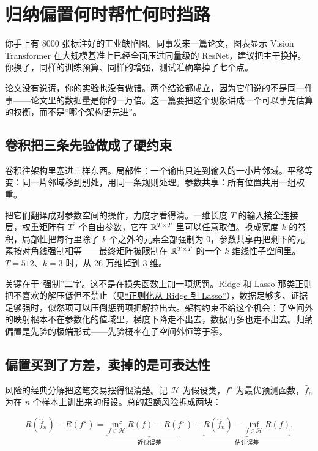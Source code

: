 \section{归纳偏置何时帮忙何时挡路}
\label{sec:14-Deep-Learning/04-Convolutional-Networks/05}

你手上有 8000 张标注好的工业缺陷图。同事发来一篇论文，图表显示 Vision Transformer 在大规模基准上已经全面压过同量级的 ResNet，建议把主干换掉。你换了，同样的训练预算、同样的增强，测试准确率掉了七个点。

论文没有说谎，你的实验也没有做错。两个结论都成立，因为它们说的不是同一件事——论文里的数据量是你的一万倍。这一篇要把这个现象讲成一个可以事先估算的权衡，而不是``哪个架构更先进''。

\subsection{卷积把三条先验做成了硬约束}

卷积往架构里塞进三样东西。局部性：一个输出只连到输入的一小片邻域。平移等变：同一片邻域移到别处，用同一条规则处理。参数共享：所有位置共用一组权重。

把它们翻译成对参数空间的操作，力度才看得清。一维长度 \(T\) 的输入接全连接层，权重矩阵有 \(T^2\) 个自由参数，它在 \(\mathbb{R}^{T\times T}\) 里可以任意取值。换成宽度 \(k\) 的卷积，局部性把每行里除了 \(k\) 个之外的元素全部强制为 0，参数共享再把剩下的元素按对角线强制相等——最终矩阵被限制在 \(\mathbb{R}^{T\times T}\) 的一个 \(k\) 维线性子空间里。\(T=512\)、\(k=3\) 时，从 26 万维掉到 3 维。

关键在于``强制''二字。这不是在损失函数上加一项惩罚。Ridge 和 Lasso 那类正则把不喜欢的解压低但不禁止（见\hyperref[sec:13-Machine-Learning/02-Linear-Models/02]{``正则化从 Ridge 到 Lasso''}），数据足够多、证据足够强时，似然项可以压倒惩罚项把解拉出去。架构约束不给这个机会：子空间外的映射根本不在参数化的值域里，梯度下降走不出去，数据再多也走不出去。归纳偏置是先验的极端形式——先验概率在子空间外恒等于零。

\subsection{偏置买到了方差，卖掉的是可表达性}

风险的经典分解把这笔交易摆得很清楚。记 \(\mathcal{H}\) 为假设类，\(f^\star\) 为最优预测函数，\(\hat f_n\) 为在 \(n\) 个样本上训出来的假设。总的超额风险拆成两块：

\[
R(\hat f_n)-R(f^\star)
= \underbrace{\inf_{f\in\mathcal H}R(f)-R(f^\star)}_{\text{近似误差}}
+ \underbrace{R(\hat f_n)-\inf_{f\in\mathcal H}R(f)}_{\text{估计误差}} .
\]

